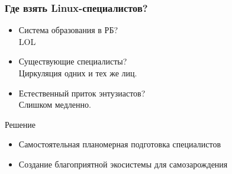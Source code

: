 \begin{frame}
	\frametitle{Где взять Linux-специалистов?}

	\begin{block}{}
		\begin{itemize}
			\item Система образования в РБ? \\
				LOL
				\pause
			\item Существующие специалисты? \\
				Циркуляция одних и тех же лиц.
				\pause
			\item Естественный приток энтузиастов? \\
				Слишком медленно.
		\end{itemize}
	\end{block}

	\begin{block}{Решение}
		\begin{itemize}
			\item Самостоятельная планомерная подготовка специалистов
			\item Создание благоприятной экосистемы для самозарождения
		\end{itemize}

	\end{block}
\end{frame}

